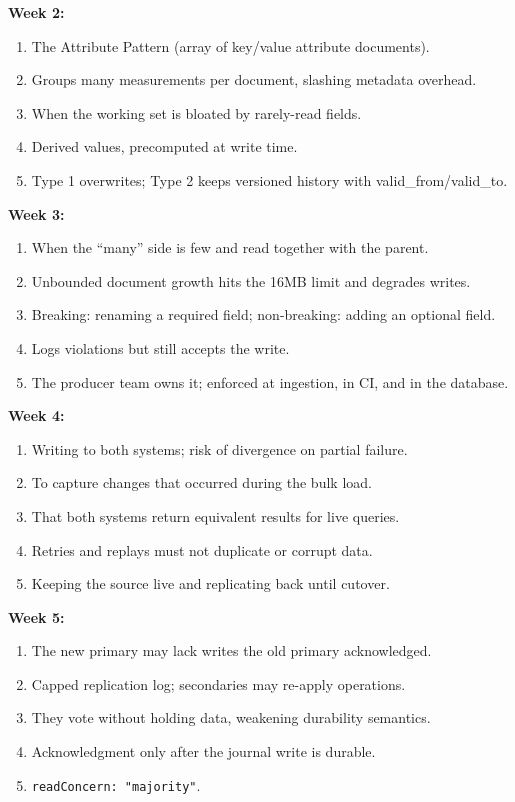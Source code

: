 \documentclass[11pt, a4paper]{article}
\begin{document}
\textbf{Week 2:}
\begin{enumerate}[itemsep=0pt]
    \item The Attribute Pattern (array of key/value attribute documents).
    \item Groups many measurements per document, slashing metadata overhead.
    \item When the working set is bloated by rarely-read fields.
    \item Derived values, precomputed at write time.
    \item Type 1 overwrites; Type 2 keeps versioned history with valid\_from/valid\_to.
\end{enumerate}

\textbf{Week 3:}
\begin{enumerate}[itemsep=0pt]
    \item When the ``many'' side is few and read together with the parent.
    \item Unbounded document growth hits the 16MB limit and degrades writes.
    \item Breaking: renaming a required field; non-breaking: adding an optional field.
    \item Logs violations but still accepts the write.
    \item The producer team owns it; enforced at ingestion, in CI, and in the database.
\end{enumerate}

\textbf{Week 4:}
\begin{enumerate}[itemsep=0pt]
    \item Writing to both systems; risk of divergence on partial failure.
    \item To capture changes that occurred during the bulk load.
    \item That both systems return equivalent results for live queries.
    \item Retries and replays must not duplicate or corrupt data.
    \item Keeping the source live and replicating back until cutover.
\end{enumerate}

\textbf{Week 5:}
\begin{enumerate}[itemsep=0pt]
    \item The new primary may lack writes the old primary acknowledged.
    \item Capped replication log; secondaries may re-apply operations.
    \item They vote without holding data, weakening durability semantics.
    \item Acknowledgment only after the journal write is durable.
    \item \texttt{readConcern: "majority"}.
\end{enumerate}
\end{document}
